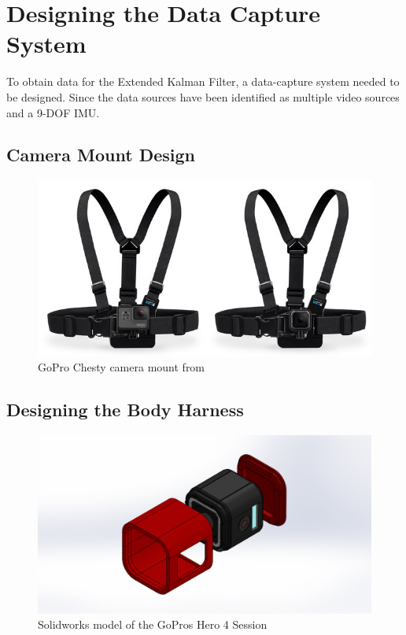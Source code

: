 \chapter{Designing the Data Capture System}
To obtain data for the Extended Kalman Filter, a data-capture system needed to be designed. Since the data sources have been identified as multiple video sources and a 9-DOF IMU.

\section{Camera Mount Design}


\begin{figure}
  \includegraphics{figures/chesty.png}
  \caption{GoPro Chesty camera mount from \cite{chestygpwebsite}}
  \label{fig:chesty}
\end{figure}


\section{Designing the Body Harness}

\begin{figure}[!ht]
  \includegraphics[width=\linewidth]{figures/sylvanexploded.JPG}
  \caption{Solidworks model of the GoPros Hero 4 Session}
  \label{fig:sylvancase}
\end{figure}

